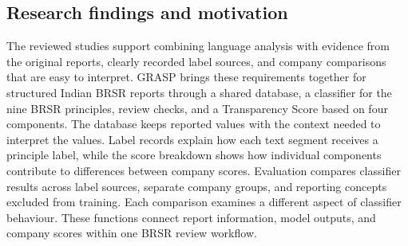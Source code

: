\subsection{Research findings and motivation}

The reviewed studies support combining language analysis with evidence from the original reports, clearly recorded label sources, and company comparisons that are easy to interpret. GRASP brings these requirements together for structured Indian BRSR reports through a shared database, a classifier for the nine BRSR principles, review checks, and a Transparency Score based on four components. The database keeps reported values with the context needed to interpret the values. Label records explain how each text segment receives a principle label, while the score breakdown shows how individual components contribute to differences between company scores. Evaluation compares classifier results across label sources, separate company groups, and reporting concepts excluded from training. Each comparison examines a different aspect of classifier behaviour. These functions connect report information, model outputs, and company scores within one BRSR review workflow.

